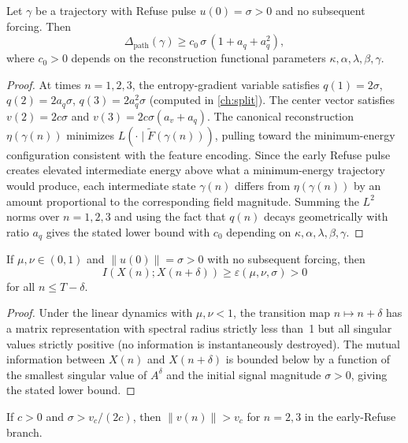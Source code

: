 \documentclass[12pt, oneside]{memoir}
\newcommand{\Ft}{\widetilde{F}}
\newcommand{\Dpth}{\Delta_{\mathrm{path}}}
\newcommand{\nnorm}[1]{\lVert #1 \rVert}
\newcommand{\aq}{a_q}
\newcommand{\av}{a_v}
\begin{document}
\begin{lemma}
\label{lem:lower}
Let $\gamma$ be a trajectory with Refuse pulse $u(0) = \sigma > 0$ and no subsequent
forcing.  Then
\[
  \Dpth(\gamma) \ge c_0\, \sigma\, (1 + \aq + \aq^2),
\]
where $c_0 > 0$ depends on the reconstruction functional parameters $\kappa, \alpha,
\lambda, \beta, \gamma$.
\end{lemma}

\begin{proof}
At times $n = 1, 2, 3$, the entropy-gradient variable satisfies $q(1) = 2\sigma$,
$q(2) = 2\aq\sigma$, $q(3) = 2\aq^2\sigma$ (computed in \cref{ch:split}).  The center
vector satisfies $v(2) = 2c\sigma$ and $v(3) = 2c\sigma(\av + \aq)$.  The canonical
reconstruction $\eta(\gamma(n))$ minimizes $L(\cdot \mid \Ft(\gamma(n)))$, pulling toward
the minimum-energy configuration consistent with the feature encoding.  Since the early
Refuse pulse creates elevated intermediate energy above what a minimum-energy trajectory
would produce, each intermediate state $\gamma(n)$ differs from $\eta(\gamma(n))$ by an
amount proportional to the corresponding field magnitude.  Summing the $L^2$ norms over
$n = 1, 2, 3$ and using the fact that $q(n)$ decays geometrically with ratio $\aq$ gives
the stated lower bound with $c_0$ depending on $\kappa, \alpha, \lambda, \beta, \gamma$.
\end{proof}

\begin{lemma}
\label{lem:MI}
If $\mu, \nu \in (0,1)$ and $\nnorm{u(0)} = \sigma > 0$ with no subsequent forcing, then
\[
  I(X(n); X(n+\delta)) \ge \varepsilon(\mu, \nu, \sigma) > 0
\]
for all $n \le T - \delta$.
\end{lemma}

\begin{proof}
Under the linear dynamics  with $\mu, \nu < 1$, the
transition map $n \mapsto n+\delta$ has a matrix representation with spectral radius
strictly less than~1 but all singular values strictly positive (no information is
instantaneously destroyed).  The mutual information between $X(n)$ and $X(n+\delta)$ is
bounded below by a function of the smallest singular value of $A^\delta$ and the initial
signal magnitude $\sigma > 0$, giving the stated lower bound.
\end{proof}

\begin{lemma}
\label{lem:transport}
If $c > 0$ and $\sigma > v_c/(2c)$, then $\nnorm{v(n)} > v_c$ for $n = 2, 3$ in the
early-Refuse branch.
\end{lemma}
\end{document}
